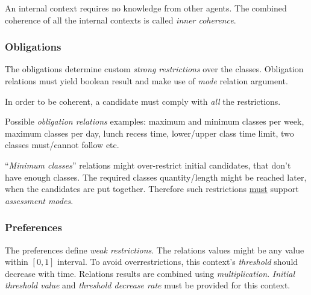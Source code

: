 \documentclass[../ThesisDoc]{subfiles}
\begin{document}
\providecommand{\rootdir}{..}


An internal context requires no knowledge from other agents.
The combined coherence of all the internal contexts is called
\emph{inner coherence}.

\subsubsection{Obligations}

The obligations determine custom \emph{strong restrictions} over the classes.
Obligation relations must yield boolean result and make use of
\emph{mode} relation argument.

In order to be coherent, a candidate must comply with \emph{all} the restrictions.

\medskip

Possible \emph{obligation relations} examples:
maximum and minimum classes per week, maximum classes per day,
lunch recess time, lower/upper class time limit, two classes must/cannot follow etc.

``\emph{Minimum classes}'' relations might over-restrict initial candidates, that
don't have enough classes. The required classes quantity/length might be reached later,
when the candidates are put together.
Therefore such restrictions \underline{must} support \emph{assessment modes}.


\subsubsection{Preferences}

The preferences define \emph{weak restrictions}. The relations values might be any
value within $[0,1]$ interval. To avoid overrestrictions, this context's \emph{threshold}
should decrease with time. Relations results are combined using \emph{multiplication}.
\emph{Initial threshold value} and \emph{threshold decrease rate} must be
provided for this context.

\end{document}
